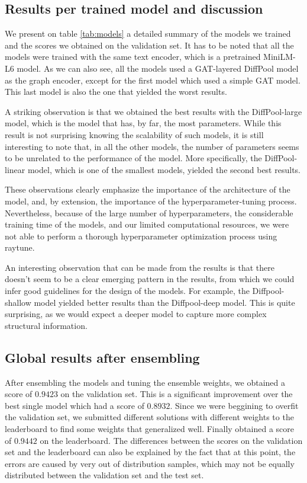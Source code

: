 \documentclass[switch, 11pt]{article}
\begin{document}
\begin{multicols}{2}
    \subsection{Results per trained model and discussion}

    We present on table \ref{tab:models} a detailed summary of the models we trained and the scores we obtained on the validation set. It has to be noted that all the models were trained with the same text encoder, which is a pretrained MiniLM-L6 model. As we can also see, all the models used a GAT-layered DiffPool model as the graph encoder, except for the first model which used a simple GAT model. This last model is also the one that yielded the worst results.

    A striking observation is that we obtained the best results with the DiffPool-large model, which is the model that has, by far, the most parameters. While this result is not surprising knowing the scalability of such models, it is still interesting to note that, in all the other models, the number of parameters seems to be unrelated to the performance of the model. More specifically, the DiffPool-linear model, which is one of the smallest models, yielded the second best results.

    These observations clearly emphasize the importance of the architecture of the model, and, by extension, the importance of the hyperparameter-tuning process. Nevertheless, because of the large number of hyperparameters, the considerable training time of the models, and our limited computational resources, we were not able to perform a thorough hyperparameter optimization process using raytune.

    An interesting observation that can be made from the results is that there doesn't seem to be a clear emerging pattern in the results, from which we could infer good guidelines for the design of the models. For example, the Diffpool-shallow model yielded better results than the Diffpool-deep model. This is quite surprising, as we would expect a deeper model to capture more complex structural information.


    \subsection{Global results after ensembling}
    After ensembling the models and tuning the ensemble weights, we obtained a score of $0.9423$ on the validation set. This is a significant improvement over the best single model which had a score of $0.8932$. Since we were beggining to overfit the validation set, we submitted different solutions with different weights to the leaderboard to find some weights that generalized well. Finally obtained a score of $0.9442$ on the leaderboard. The differences between the scores on the validation set and the leaderboard can also be explained by the fact that at this point, the errors are caused by very out of distribution samples, which may not be equally distributed between the validation set and the test set.


\end{multicols}
\end{document}
